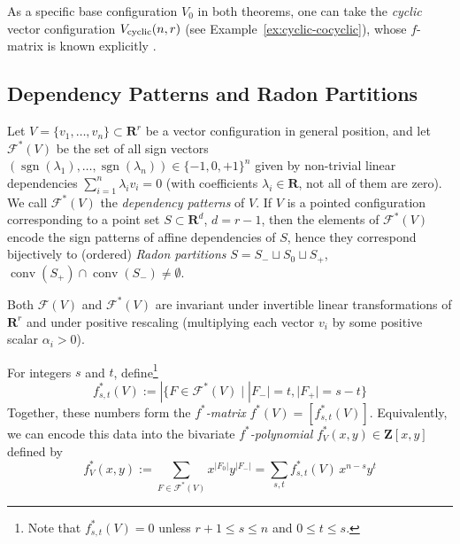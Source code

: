 \documentclass[a4paper,USenglish,cleveref, autoref, thm-restate,nolineno]{socg-lipics-v2021}
\DeclareMathOperator{\sgn}{sgn}
\DeclareMathOperator{\conv}{conv}
\renewcommand{\leq}{\leqslant}
\newcommand{\R}{\mathbf{R}}
\newcommand{\Z}{\mathbf{Z}}
\DeclarePairedDelimiter\floor{\lfloor}{\rfloor}
\newcommand{\cyclic}{V_{\textup{cyclic}}}
\begin{document}
\begin{remark}
As a specific base configuration $V_0$ in both theorems, one can take the \emph{cyclic} vector configuration $\cyclic(n,r)$ (see Example~\ref{ex:cyclic-cocyclic}), whose $f$-matrix is known explicitly \cite{Andrzejak:2003aa}. 
\end{remark}




\subsection{Dependency Patterns and Radon Partitions}
Let $V = \{ v_1, \ldots, v_n \} \subset \R^r$ be a vector configuration in general position, and let $\mathcal{F}^*(V)$ be the set of all sign vectors $(\sgn(\lambda_1),\dots,\sgn(\lambda_n)) \in \{-1,0,+1\}^n$ given by non-trivial linear dependencies $\sum_{i=1}^n \lambda_i v_i=0$ (with coefficients $\lambda_i\in \R$, not all of them are zero). We call $\mathcal{F}^*(V)$ the \emph{dependency patterns} of $V$. If $V$ is a pointed configuration corresponding to a point set $S\subset \R^d$, $d=r-1$, then the elements of $\mathcal{F}^*(V)$ encode the sign patterns of affine dependencies of $S$, hence they correspond bijectively to (ordered) \emph{Radon partitions} $S=S_-\sqcup S_0 \sqcup S_+$, $\conv(S_+) \cap \conv(S_-)\neq \emptyset$. 

Both $\mathcal{F}(V)$ and $\mathcal{F}^*(V)$ are invariant under invertible linear transformations of $\R^r$ and under positive rescaling (multiplying each vector $v_i$ by some positive scalar $\alpha_i>0$).



\begin{definition} 
\label{def:fstar-poly}
For integers $s$ and $t$, define\footnote{Note that $f^*_{s,t}(V)=0$ unless $r+1\leq s\leq n$ and $0\leq t\leq s$.%
}
\[
f^*_{s,t}(V):=|\{F\in \mathcal{F}^*(V)\mid |F_-|=t, |F_+|=s-t\}
\]
Together, these numbers form the \emph{$f^*$-matrix} $f^*(V)=[f^*_{s,t}(V)]$. Equivalently, we can encode this data into the bivariate  \emph{$f^*$-polynomial} $f^*_V(x,y) \in \Z[x,y]$ defined by 
\[
f^*_{V}(x,y) := \sum_{F\in \mathcal{F}^*(V)} x^{|F_0|} y^{|F_-|} = \sum_{s,t} f^*_{s,t}(V)\, x^{n-s} y^t
\]
\end{definition}
\end{document}
